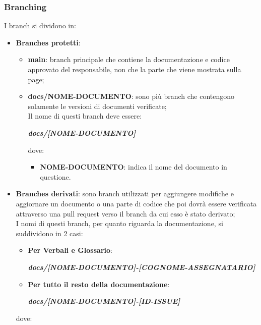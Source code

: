         \subsubsection{Branching}\label{inf:branch}
        I branch si dividono in:
        \begin{itemize}
            \item \textbf{Branches protetti}: 
            \begin{itemize}
                \item \textbf{main}: branch principale che contiene la documentazione e codice approvato del responsabile, non che la parte che viene mostrata sulla page;
                \item \textbf{docs/NOME-DOCUMENTO}: sono più branch che contengono solamente le versioni di documenti verificate;\\
                Il nome di questi branch deve essere:
                \begin{center}
                    \textbf{\textit{docs/[NOME-DOCUMENTO]}}
                \end{center}
                dove:
                \begin{itemize}
                    \item \textbf{NOME-DOCUMENTO}: indica il nome del documento in questione.
                \end{itemize}
            \end{itemize}
            \item \textbf{Branches derivati}: sono branch utilizzati per aggiungere modifiche e aggiornare un documento o una parte di codice che poi dovrà essere verificata
            attraverso una pull request verso il branch da cui esso è stato derivato;\\
            I nomi di questi branch, per quanto riguarda la documentazione, si suddividono in 2 casi:
            \begin{itemize}
                \item \textbf{Per Verbali e Glossario}:
                \begin{center}
                    \textbf{\textit{docs/[NOME-DOCUMENTO]-[COGNOME-ASSEGNATARIO]}}
                \end{center}
                \item \textbf{Per tutto il resto della documentazione}:
                \begin{center}
                    \textbf{\textit{docs/[NOME-DOCUMENTO]-[ID-ISSUE]}}
                \end{center}
            \end{itemize}
            dove:
    

\end{itemize}

